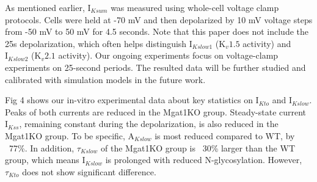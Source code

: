 \documentclass[10pt,letterpaper]{article}
\begin{document}
As mentioned earlier, $\text{I}_{Ksum}$ was measured using whole-cell voltage clamp protocols. Cells were held at -70 mV and then depolarized by 10 mV voltage steps from -50 mV to 50 mV for 4.5 seconds. Note that this paper does not include the 25s depolarization, which often helps distinguish $\text{I}_{Kslow1}$ ($\text{K}_{v}1.5$ activity) and $\text{I}_{Kslow2}$ ($\text{K}_{v}2.1$ activity). Our ongoing experiments focus on voltage-clamp experiments on 25-second periods. The resulted data will be further studied and calibrated with simulation models in the future work.

Fig 4 shows our in-vitro experimental data about key statistics on $\text{I}_{Kto}$ and $\text{I}_{Kslow}$. Peaks of both currents are reduced in the Mgat1KO group. Steady-state current $\text{I}_{Kss}$, remaining constant during the depolarization, is also reduced in the Mgat1KO group. To be specific, $\text{A}_{Kslow}$ is most reduced compared to WT, by ~77\%. In addition, $\tau_{Kslow}$ of the Mgat1KO group is ~30\% larger than the WT group, which means $\text{I}_{Kslow}$ is prolonged with reduced N-glycosylation. However, $\tau_{Kto}$ does not show significant difference.
\end{document}
